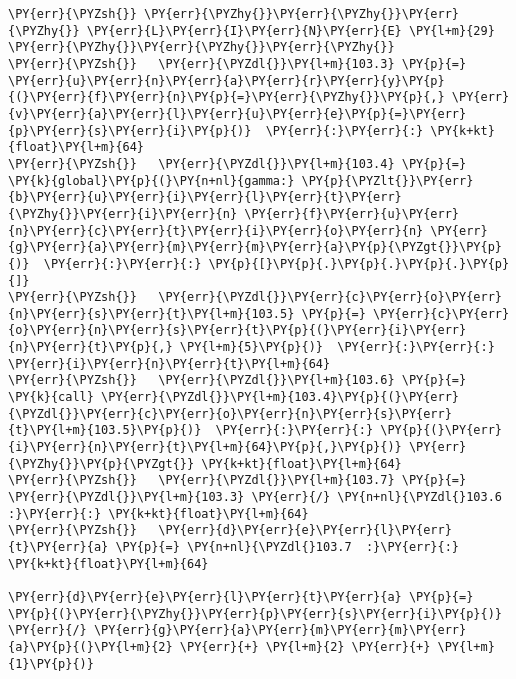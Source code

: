 \begin{Verbatim}[commandchars=\\\{\}]
\PY{err}{\PYZsh{}} \PY{err}{\PYZhy{}}\PY{err}{\PYZhy{}}\PY{err}{\PYZhy{}} \PY{err}{L}\PY{err}{I}\PY{err}{N}\PY{err}{E} \PY{l+m}{29} \PY{err}{\PYZhy{}}\PY{err}{\PYZhy{}}\PY{err}{\PYZhy{}} 
\PY{err}{\PYZsh{}}   \PY{err}{\PYZdl{}}\PY{l+m}{103.3} \PY{p}{=} \PY{err}{u}\PY{err}{n}\PY{err}{a}\PY{err}{r}\PY{err}{y}\PY{p}{(}\PY{err}{f}\PY{err}{n}\PY{p}{=}\PY{err}{\PYZhy{}}\PY{p}{,} \PY{err}{v}\PY{err}{a}\PY{err}{l}\PY{err}{u}\PY{err}{e}\PY{p}{=}\PY{err}{p}\PY{err}{s}\PY{err}{i}\PY{p}{)}  \PY{err}{:}\PY{err}{:} \PY{k+kt}{float}\PY{l+m}{64}
\PY{err}{\PYZsh{}}   \PY{err}{\PYZdl{}}\PY{l+m}{103.4} \PY{p}{=} \PY{k}{global}\PY{p}{(}\PY{n+nl}{gamma:} \PY{p}{\PYZlt{}}\PY{err}{b}\PY{err}{u}\PY{err}{i}\PY{err}{l}\PY{err}{t}\PY{err}{\PYZhy{}}\PY{err}{i}\PY{err}{n} \PY{err}{f}\PY{err}{u}\PY{err}{n}\PY{err}{c}\PY{err}{t}\PY{err}{i}\PY{err}{o}\PY{err}{n} \PY{err}{g}\PY{err}{a}\PY{err}{m}\PY{err}{m}\PY{err}{a}\PY{p}{\PYZgt{}}\PY{p}{)}  \PY{err}{:}\PY{err}{:} \PY{p}{[}\PY{p}{.}\PY{p}{.}\PY{p}{.}\PY{p}{]}
\PY{err}{\PYZsh{}}   \PY{err}{\PYZdl{}}\PY{err}{c}\PY{err}{o}\PY{err}{n}\PY{err}{s}\PY{err}{t}\PY{l+m}{103.5} \PY{p}{=} \PY{err}{c}\PY{err}{o}\PY{err}{n}\PY{err}{s}\PY{err}{t}\PY{p}{(}\PY{err}{i}\PY{err}{n}\PY{err}{t}\PY{p}{,} \PY{l+m}{5}\PY{p}{)}  \PY{err}{:}\PY{err}{:} \PY{err}{i}\PY{err}{n}\PY{err}{t}\PY{l+m}{64}
\PY{err}{\PYZsh{}}   \PY{err}{\PYZdl{}}\PY{l+m}{103.6} \PY{p}{=} \PY{k}{call} \PY{err}{\PYZdl{}}\PY{l+m}{103.4}\PY{p}{(}\PY{err}{\PYZdl{}}\PY{err}{c}\PY{err}{o}\PY{err}{n}\PY{err}{s}\PY{err}{t}\PY{l+m}{103.5}\PY{p}{)}  \PY{err}{:}\PY{err}{:} \PY{p}{(}\PY{err}{i}\PY{err}{n}\PY{err}{t}\PY{l+m}{64}\PY{p}{,}\PY{p}{)} \PY{err}{\PYZhy{}}\PY{p}{\PYZgt{}} \PY{k+kt}{float}\PY{l+m}{64}
\PY{err}{\PYZsh{}}   \PY{err}{\PYZdl{}}\PY{l+m}{103.7} \PY{p}{=} \PY{err}{\PYZdl{}}\PY{l+m}{103.3} \PY{err}{/} \PY{n+nl}{\PYZdl{}103.6  :}\PY{err}{:} \PY{k+kt}{float}\PY{l+m}{64}
\PY{err}{\PYZsh{}}   \PY{err}{d}\PY{err}{e}\PY{err}{l}\PY{err}{t}\PY{err}{a} \PY{p}{=} \PY{n+nl}{\PYZdl{}103.7  :}\PY{err}{:} \PY{k+kt}{float}\PY{l+m}{64}

\PY{err}{d}\PY{err}{e}\PY{err}{l}\PY{err}{t}\PY{err}{a} \PY{p}{=} \PY{p}{(}\PY{err}{\PYZhy{}}\PY{err}{p}\PY{err}{s}\PY{err}{i}\PY{p}{)} \PY{err}{/} \PY{err}{g}\PY{err}{a}\PY{err}{m}\PY{err}{m}\PY{err}{a}\PY{p}{(}\PY{l+m}{2} \PY{err}{+} \PY{l+m}{2} \PY{err}{+} \PY{l+m}{1}\PY{p}{)}
\end{Verbatim}

